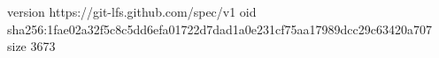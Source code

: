 version https://git-lfs.github.com/spec/v1
oid sha256:1fae02a32f5c8c5dd6efa01722d7dad1a0e231cf75aa17989dcc29c63420a707
size 3673
